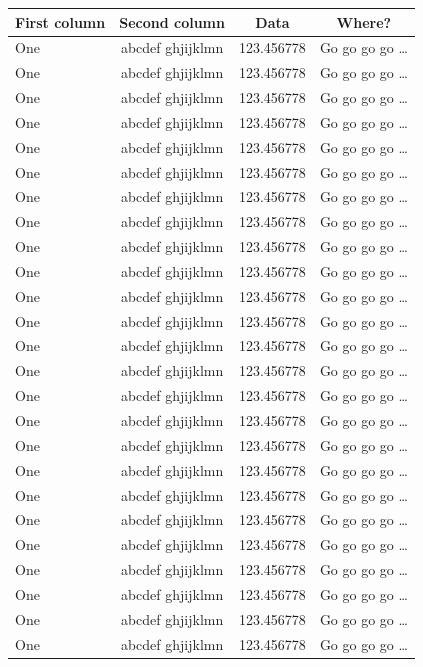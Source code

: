 \documentclass[phd,showgrids]{ndsu-thesis-2022}
\begin{document}
{\begin{longtable}{l c c c }
        \midrule
	First column & Second column & Data & Where?\\
        \midrule
        \endhead
One & abcdef ghjijklmn & 123.456778  & Go go go go \ldots \\
One & abcdef ghjijklmn & 123.456778  & Go go go go \ldots \\
One & abcdef ghjijklmn & 123.456778  & Go go go go \ldots \\
One & abcdef ghjijklmn & 123.456778  & Go go go go \ldots \\
One & abcdef ghjijklmn & 123.456778  & Go go go go \ldots \\
One & abcdef ghjijklmn & 123.456778  & Go go go go \ldots \\
One & abcdef ghjijklmn & 123.456778  & Go go go go \ldots \\
One & abcdef ghjijklmn & 123.456778  & Go go go go \ldots \\
One & abcdef ghjijklmn & 123.456778  & Go go go go \ldots \\
One & abcdef ghjijklmn & 123.456778  & Go go go go \ldots \\
One & abcdef ghjijklmn & 123.456778  & Go go go go \ldots \\
One & abcdef ghjijklmn & 123.456778  & Go go go go \ldots \\
One & abcdef ghjijklmn & 123.456778  & Go go go go \ldots \\
One & abcdef ghjijklmn & 123.456778  & Go go go go \ldots \\
One & abcdef ghjijklmn & 123.456778  & Go go go go \ldots \\
One & abcdef ghjijklmn & 123.456778  & Go go go go \ldots \\
One & abcdef ghjijklmn & 123.456778  & Go go go go \ldots \\
One & abcdef ghjijklmn & 123.456778  & Go go go go \ldots \\
One & abcdef ghjijklmn & 123.456778  & Go go go go \ldots \\
One & abcdef ghjijklmn & 123.456778  & Go go go go \ldots \\
One & abcdef ghjijklmn & 123.456778  & Go go go go \ldots \\
One & abcdef ghjijklmn & 123.456778  & Go go go go \ldots \\
One & abcdef ghjijklmn & 123.456778  & Go go go go \ldots \\
One & abcdef ghjijklmn & 123.456778  & Go go go go \ldots \\
One & abcdef ghjijklmn & 123.456778  & Go go go go \ldots \\

\end{longtable}}
\end{document}
